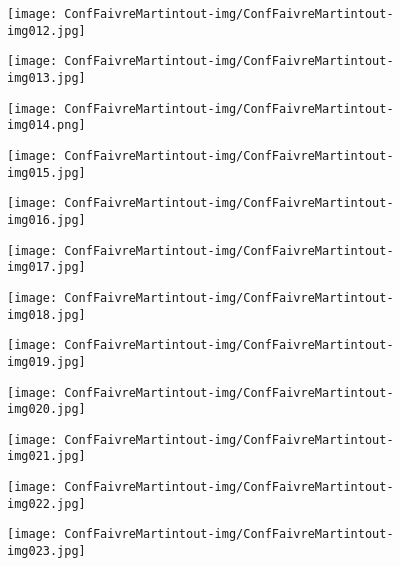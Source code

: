 \documentclass[a4paper]{article}
\begin{document}
\begin{figure}
\centering
\texttt{[image: ConfFaivreMartintout-img/ConfFaivreMartintout-img012.jpg]}
\end{figure}
\begin{figure}
\centering
\texttt{[image: ConfFaivreMartintout-img/ConfFaivreMartintout-img013.jpg]}
\end{figure}
\begin{figure}
\centering
\texttt{[image: ConfFaivreMartintout-img/ConfFaivreMartintout-img014.png]}
\end{figure}
\begin{figure}
\centering
\texttt{[image: ConfFaivreMartintout-img/ConfFaivreMartintout-img015.jpg]}
\end{figure}
\begin{figure}
\centering
\texttt{[image: ConfFaivreMartintout-img/ConfFaivreMartintout-img016.jpg]}
\end{figure}
\begin{figure}
\centering
\texttt{[image: ConfFaivreMartintout-img/ConfFaivreMartintout-img017.jpg]}
\end{figure}
\begin{figure}
\centering
\texttt{[image: ConfFaivreMartintout-img/ConfFaivreMartintout-img018.jpg]}
\end{figure}
\begin{figure}
\centering
\texttt{[image: ConfFaivreMartintout-img/ConfFaivreMartintout-img019.jpg]}
\end{figure}
\begin{figure}
\centering
\texttt{[image: ConfFaivreMartintout-img/ConfFaivreMartintout-img020.jpg]}
\end{figure}
\begin{figure}
\centering
\texttt{[image: ConfFaivreMartintout-img/ConfFaivreMartintout-img021.jpg]}
\end{figure}
\begin{figure}
\centering
\texttt{[image: ConfFaivreMartintout-img/ConfFaivreMartintout-img022.jpg]}
\end{figure}
\begin{figure}
\centering
\texttt{[image: ConfFaivreMartintout-img/ConfFaivreMartintout-img023.jpg]}
\end{figure}
\end{document}
